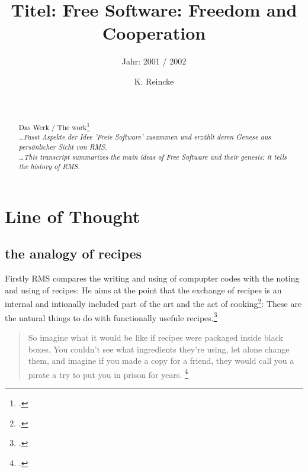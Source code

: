 \documentclass[DIV=calc,BCOR=5mm,11pt,headings=small,oneside,abstract=true, toc=bib]{scrartcl}
\begin{document}

\titlehead{Literaturexzerpt}
\subject{Autor(en): Stallman / Stallman2001a}
\title{Titel: Free Software: Freedom and Cooperation}
\subtitle{Jahr: 2001 / 2002 }
\author{K. Reincke}

\maketitle

\begin{abstract}
\noindent
\cite[(in:)][]{StaGay2002a} \\
\noindent
\cite[(ist:)][]{Stallman2001a} \\
Das Werk / The work\footcite[][]{Stallman2001a} \\
\noindent \itshape
\ldots  Fasst Aspekte der Idee 'Freie Software' zusammen und erzählt deren
Genese aus persönlicher Sicht von RMS.
\\
\noindent
\ldots This transcript summarizes the main ideas of Free Software and their
genesis: it tells the history of RMS.
\end{abstract}
\footnotesize
\normalsize

\section{Line of Thought}

\subsection{the analogy of recipes}
Firstly RMS compares the writing and using of compupter codes with the noting
and using of recipes: He aims at the point that the exchange of recipes is an
internal and intionally included part of the art and the act of
cooking\footcite[cf][156]{Stallman2001a}: \glqq{}These are the natural things to
do with functionally usefule recipes.\grqq{}\footcite[][156]{Stallman2001a}

\begin{quote}
\glqq{}So imagine what it would be like if recipes were packaged inside black
boxes. You couldn't see what ingredients they're using, let alone change them,
and imagine if you made a copy for a friend, they would call you a pirate a try
to put you in prison for years.
\grqq{}\footcite[][157]{Stallman2001a}
\end{quote}
\end{document}
